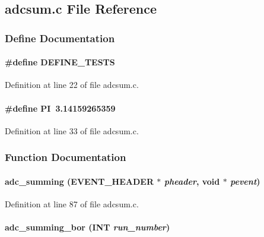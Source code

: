 \subsection{adcsum.c File Reference}
\label{adcsum_8c}


\subsubsection{Define Documentation}
\paragraph[{DEFINE\_\-TESTS}]{\setlength{\rightskip}{0pt plus 5cm}\#define DEFINE\_\-TESTS}\hfill\label{adcsum_8c_a31569d5acde1be6aa6ef7c8f3a705e75}


Definition at line 22 of file adcsum.c.
\paragraph[{PI}]{\setlength{\rightskip}{0pt plus 5cm}\#define PI~3.14159265359}\hfill\label{adcsum_8c_a598a3330b3c21701223ee0ca14316eca}


Definition at line 33 of file adcsum.c.

\subsubsection{Function Documentation}
\paragraph[{adc\_\-summing}]{ adc\_\-summing ({\bf EVENT\_\-HEADER} $\ast$ {\em pheader}, \/  void $\ast$ {\em pevent})}\hfill\label{adcsum_8c_aedcf19b16c2e259c198765bf3c10cde9}


Definition at line 87 of file adcsum.c.
\paragraph[{adc\_\-summing\_\-bor}]{ adc\_\-summing\_\-bor ({\bf INT} {\em run\_\-number})}\hfill\label{adcsum_8c_ae46098121be2a9edc7739515c96fd8bc}
